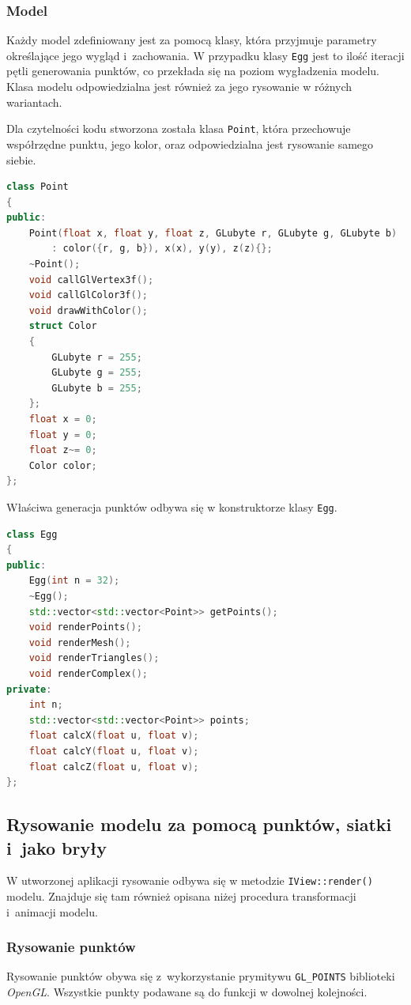 \subsubsection{Model}
Każdy model zdefiniowany jest za pomocą klasy, która przyjmuje parametry określające jego wygląd i~zachowania. W przypadku klasy \lstinline{Egg} jest to ilość iteracji pętli generowania punktów, co przekłada się na poziom wygładzenia modelu. Klasa modelu odpowiedzialna jest również za jego rysowanie w różnych wariantach.

Dla czytelności kodu stworzona została klasa \lstinline{Point}, która przechowuje współrzędne punktu, jego kolor, oraz odpowiedzialna jest rysowanie samego siebie.

\begin{lstlisting}[language=C++, caption=Nagłówek klasy Point.]
class Point
{
public:
    Point(float x, float y, float z, GLubyte r, GLubyte g, GLubyte b)
        : color({r, g, b}), x(x), y(y), z(z){};
    ~Point();
    void callGlVertex3f();
    void callGlColor3f();
    void drawWithColor();
    struct Color
    {
        GLubyte r = 255;
        GLubyte g = 255;
        GLubyte b = 255;
    };
    float x = 0;
    float y = 0;
    float z~= 0;
    Color color;
};
\end{lstlisting}
Właściwa generacja punktów odbywa się w konstruktorze klasy \lstinline{Egg}.
\begin{lstlisting}[language=C++, caption=Nagłówek klasy modelu Egg.]
class Egg
{
public:
    Egg(int n = 32);
    ~Egg();
    std::vector<std::vector<Point>> getPoints();
    void renderPoints();
    void renderMesh();
    void renderTriangles();
    void renderComplex();
private:
    int n;
    std::vector<std::vector<Point>> points;
    float calcX(float u, float v);
    float calcY(float u, float v);
    float calcZ(float u, float v);
};
\end{lstlisting}
\newpage
\subsection{Rysowanie modelu za pomocą punktów, siatki i~jako bryły}

W utworzonej aplikacji rysowanie odbywa się w metodzie \lstinline{IView::render()} modelu. Znajduje się tam również opisana niżej procedura transformacji i~animacji modelu.
\subsubsection{Rysowanie punktów}
Rysowanie punktów obywa się z~wykorzystanie prymitywu \lstinline{GL_POINTS} biblioteki \textit{OpenGL}. Wszystkie punkty podawane są do funkcji w dowolnej kolejności.


